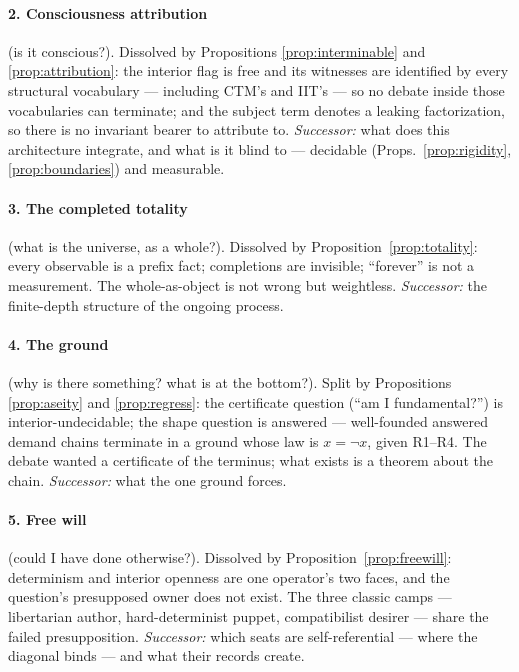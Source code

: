 \documentclass[11pt]{article}
\theoremstyle{remark}
\begin{document}
\paragraph{2. Consciousness attribution} (is it conscious?). Dissolved by Propositions \ref{prop:interminable} and \ref{prop:attribution}: the interior flag is free and its witnesses are identified by every structural vocabulary --- including CTM's and IIT's --- so no debate inside those vocabularies can terminate; and the subject term denotes a leaking factorization, so there is no invariant bearer to attribute to. \emph{Successor:} what does this architecture integrate, and what is it blind to --- decidable (Props.~\ref{prop:rigidity}, \ref{prop:boundaries}) and measurable.

\paragraph{3. The completed totality} (what is the universe, as a whole?). Dissolved by Proposition~\ref{prop:totality}: every observable is a prefix fact; completions are invisible; ``forever'' is not a measurement. The whole-as-object is not wrong but weightless. \emph{Successor:} the finite-depth structure of the ongoing process.

\paragraph{4. The ground} (why is there something? what is at the bottom?). Split by Propositions \ref{prop:aseity} and \ref{prop:regress}: the certificate question (``am I fundamental?'') is interior-undecidable; the shape question is answered --- well-founded answered demand chains terminate in a ground whose law is $x = \lnot x$, given R1--R4. The debate wanted a certificate of the terminus; what exists is a theorem about the chain. \emph{Successor:} what the one ground forces.

\paragraph{5. Free will} (could I have done otherwise?). Dissolved by Proposition~\ref{prop:freewill}: determinism and interior openness are one operator's two faces, and the question's presupposed owner does not exist. The three classic camps --- libertarian author, hard-determinist puppet, compatibilist desirer --- share the failed presupposition. \emph{Successor:} which seats are self-referential --- where the diagonal binds --- and what their records create.
\end{document}
